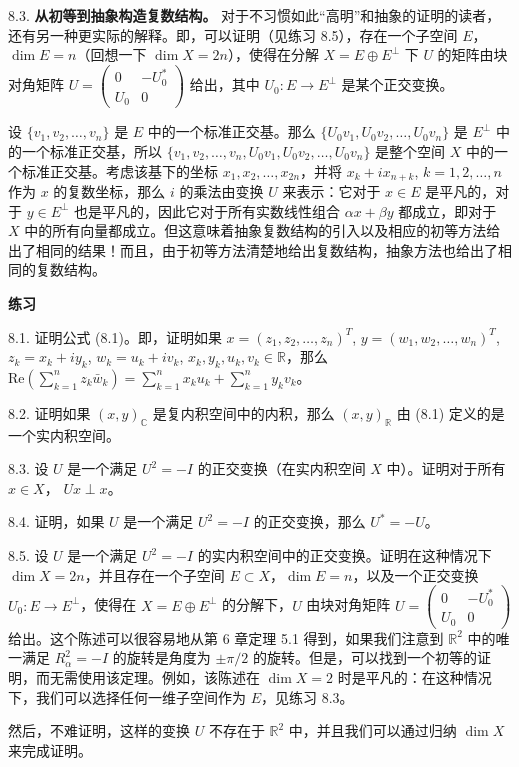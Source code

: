 8.3. \textbf{从初等到抽象构造复数结构。} 对于不习惯如此“高明”和抽象的证明的读者，还有另一种更实际的解释。即，可以证明（见练习 8.5），存在一个子空间 $E$，$\dim E = n$（回想一下 $\dim X = 2n$），使得在分解 $X = E \oplus E^\perp$ 下 $U$ 的矩阵由块对角矩阵 $U = \begin{pmatrix} 0 & -U_0^* \\ U_0 & 0 \end{pmatrix}$ 给出，其中 $U_0: E \to E^\perp$ 是某个正交变换。



设 $\{v_1, v_2, \dots, v_n\}$ 是 $E$ 中的一个标准正交基。那么 $\{U_0 v_1, U_0 v_2, \dots, U_0 v_n\}$ 是 $E^\perp$ 中的一个标准正交基，所以 $\{v_1, v_2, \dots, v_n, U_0 v_1, U_0 v_2, \dots, U_0 v_n\}$ 是整个空间 $X$ 中的一个标准正交基。考虑该基下的坐标 $x_1, x_2, \dots, x_{2n}$，并将 $x_k + ix_{n+k}$, $k=1, 2, \dots, n$ 作为 $x$ 的复数坐标，那么 $i$ 的乘法由变换 $U$ 来表示：它对于 $x \in E$ 是平凡的，对于 $y \in E^\perp$ 也是平凡的，因此它对于所有实数线性组合 $\alpha x + \beta y$ 都成立，即对于 $X$ 中的所有向量都成立。但这意味着抽象复数结构的引入以及相应的初等方法给出了相同的结果！而且，由于初等方法清楚地给出复数结构，抽象方法也给出了相同的复数结构。

\textbf{练习}~

8.1. 证明公式 (8.1)。即，证明如果 $x = (z_1, z_2, \dots, z_n)^T$, $y = (w_1, w_2, \dots, w_n)^T$, $z_k = x_k + iy_k$, $w_k = u_k + iv_k$, $x_k, y_k, u_k, v_k \in \mathbb{R}$，那么 $\text{Re}(\sum_{k=1}^n z_k \bar{w}_k) = \sum_{k=1}^n x_k u_k + \sum_{k=1}^n y_k v_k$。

8.2. 证明如果 $(x, y)_{\mathbb{C}}$ 是复内积空间中的内积，那么 $(x, y)_{\mathbb{R}}$ 由 (8.1) 定义的是一个实内积空间。

8.3. 设 $U$ 是一个满足 $U^2 = -I$ 的正交变换（在实内积空间 $X$ 中）。证明对于所有 $x \in X$， $Ux \perp x$。

8.4. 证明，如果 $U$ 是一个满足 $U^2 = -I$ 的正交变换，那么 $U^* = -U$。

8.5. 设 $U$ 是一个满足 $U^2 = -I$ 的实内积空间中的正交变换。证明在这种情况下 $\dim X = 2n$，并且存在一个子空间 $E \subset X$，$\dim E = n$，以及一个正交变换 $U_0: E \to E^\perp$，使得在 $X = E \oplus E^\perp$ 的分解下，$U$ 由块对角矩阵 $U = \begin{pmatrix} 0 & -U_0^* \\ U_0 & 0 \end{pmatrix}$ 给出。这个陈述可以很容易地从第 6 章定理 5.1 得到，如果我们注意到 $\mathbb{R}^2$ 中的唯一满足 $R_\alpha^2 = -I$ 的旋转是角度为 $\pm \pi/2$ 的旋转。但是，可以找到一个初等的证明，而无需使用该定理。例如，该陈述在 $\dim X = 2$ 时是平凡的：在这种情况下，我们可以选择任何一维子空间作为 $E$，见练习 8.3。




然后，不难证明，这样的变换 $U$ 不存在于 $\mathbb{R}^2$ 中，并且我们可以通过归纳 $\dim X$ 来完成证明。



